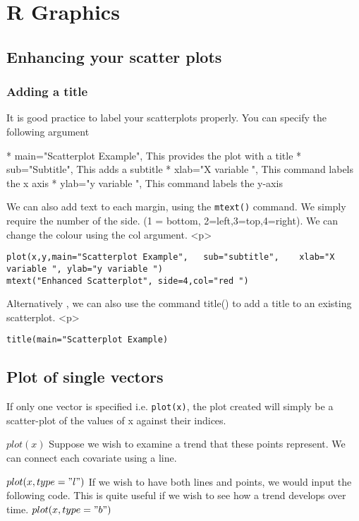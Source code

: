 \chapter{ R Graphics}
\section{Enhancing your scatter plots}




\subsection{Adding a title }

It is good practice to label your scatterplots properly. You can specify the following argument

* 	main="Scatterplot Example", 	This provides the plot with a title
* 	sub="Subtitle",                 This adds a subtitle
* 	xlab="X variable ",				This command labels the x axis 
*    ylab="y variable ",				This command labels the y-axis

We can also add text to each margin, using the \texttt{mtext()} command.  
We simply require the number of the side. (1 = bottom, 2=left,3=top,4=right). 
We can change the colour using the col argument.
<p> 
\begin{verbatim}
plot(x,y,main="Scatterplot Example",   sub="subtitle",    xlab="X variable ", ylab="y variable ")	
mtext("Enhanced Scatterplot", side=4,col="red ")
\end{verbatim}\normalsize
Alternatively , we can also use the command title() to add a title to an existing scatterplot.
<p> \begin{verbatim}
title(main="Scatterplot Example)	
\end{verbatim}\normalsize


\section{Plot of single vectors}
If only one vector is specified i.e. \texttt{plot(x)},  the plot created will simply be a scatter-plot of the values of x against their indices.

$plot(x)$
Suppose we wish to examine a trend that these points represent. We can connect each covariate using a line.

$plot(x, type = "l")$
If we wish to have both lines and points, we would input the following code. This is quite useful if we wish to see how a trend develops over time.
$plot(x, type = "b")$














